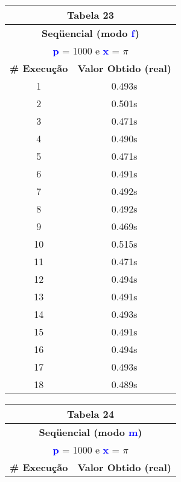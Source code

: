 \documentclass[11pt]{article}
\begin{document}
\begin{table}[!h]
	\begin{center}
		\begin{minipage}{0.48\textwidth}
			\begin{tabular}{| c | c |}
			\hline
			\multicolumn{2}{|c|}{\textbf{Tabela 23}} \\ \hline
			\multicolumn{2}{|c|}{\textbf{Seqüencial (modo \textbf{\textcolor{blue}{f}})}} \\
			\multicolumn{2}{|c|}{\textbf{\textcolor{blue}{p}} = 1000 e \textbf{\textcolor{blue}{x}} = $\pi$} \\ [0.2ex]
			\hline
				\textbf{\# Execução} &  \textbf{Valor Obtido (real)} \\ \hline
				1 & 0.493s \\ \hline
				2 & 0.501s \\ \hline
				3 & 0.471s \\ \hline
				4 & 0.490s \\ \hline
				5 & 0.471s \\ \hline
				6 & 0.491s \\ \hline
				7 & 0.492s \\ \hline
				8 & 0.492s \\ \hline
				9 & 0.469s \\ \hline
				10 & 0.515s \\ \hline
				11 & 0.471s \\ \hline
				12 & 0.494s \\ \hline
				13 & 0.491s \\ \hline
				14 & 0.493s \\ \hline
				15 & 0.491s \\ \hline
				16 & 0.494s \\ \hline
				17 & 0.493s \\ \hline
				18 & 0.489s \\ \hline
			\end{tabular}
		\end{minipage}
		\begin{minipage}{0.48\textwidth}
			\begin{tabular}{| c | c |}
			\hline
			\multicolumn{2}{|c|}{\textbf{Tabela 24}} \\ \hline
			\multicolumn{2}{|c|}{\textbf{Seqüencial (modo \textbf{\textcolor{blue}{m}})}} \\
			\multicolumn{2}{|c|}{\textbf{\textcolor{blue}{p}} = 1000 e \textbf{\textcolor{blue}{x}} = $\pi$} \\ [0.2ex]
			\hline
				\textbf{\# Execução} &  \textbf{Valor Obtido (real)} \\ \hline

\end{tabular}
\end{minipage}
\end{center}
\end{table}
\end{document}
